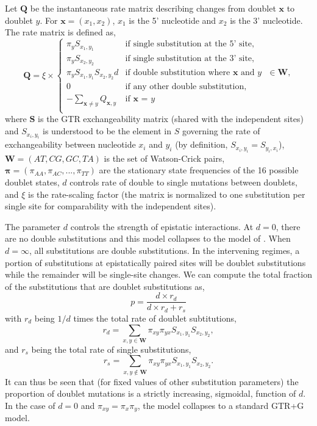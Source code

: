 \documentclass[11pt]{article}
\begin{document}
Let $\boldsymbol{Q}$ be the instantaneous rate matrix describing changes from doublet $\boldsymbol{x}$ to doublet $y$.
For $\boldsymbol{x} = (x_1, x_2)$, $x_1$ is the 5' nucleotide and $x_2$ is the 3' nucleotide.
The rate matrix is defined as,
\begin{equation}
\label{eq:Q}
\boldsymbol{Q} = \xi \times
\begin{cases}
   \pi_{y} S_{x_1, y_1} & \mbox{if single substitution at the 5' site,} \\
   \pi_{y} S_{x_2, y_2} & \mbox{if single substitution at the 3' site,} \\
   \pi_{y} S_{x_1, y_1} S_{x_2, y_2} d & \mbox{if double substitution where ${\boldsymbol{x}}$ and ${y}$ $\in {\boldsymbol{W}}$,} \\
   0 & \mbox{if any other double substitution,} \\
   - \sum_{\boldsymbol{x} \ne y} Q_{\boldsymbol{x},y}& \mbox{if $\boldsymbol{x}$ = $y$} \\
   \end{cases}
\end{equation}
where $\boldsymbol{S}$ is the GTR exchangeability matrix (shared with the independent sites) and $S_{x_i,y_i}$ is understood to be the element in $S$ governing the rate of exchangeability between nucleotide $x_i$ and $y_i$ (by definition, $S_{x_i,y_i} = S_{y_i,x_i}$),
${\boldsymbol{W}} = (AT, CG, GC, TA)$ is the set of Watson-Crick pairs,
$\boldsymbol{\pi} = (\pi_{AA}, \pi_{AC}, ..., \pi_{TT})$ are the stationary state frequencies of the 16 possible doublet states,
$d$ controls rate of double to single mutations between doublets,
and $\xi$ is the rate-scaling factor (the matrix is normalized to one substitution per single site for comparability with the independent sites).

The parameter $d$ controls the strength of epistatic interactions.
At $d = 0$, there are no double substitutions and this model collapses to the model of \cite{schoniger1994stochastic}.
When $d = \infty$, all substitutions are double substitutions.
In the intervening regimes, a portion of substitutions at epistatically paired sites will be doublet substitutions while the remainder will be single-site changes.
We can compute the total fraction of the substitutions that are doublet substitutions as,
\[
p = \frac{ d \times r_{d} }{d \times r_{d} + r_{s}}
\]
with $r_d$ being $1 / d$ times the total rate of doublet subtitutions,
\[
  r_{d} = \sum_{x,y \in \boldsymbol{W}} \pi_{xy} \pi_{yx} S_{x_1,y_1} S_{x_2,y_2},
\]
and $r_s$ being the total rate of single substitutions,
\[
  r_{s} = \sum_{x,y \not\in \boldsymbol{W}} \pi_{xy} \pi_{yx} S_{x_1,y_1} S_{x_2,y_2}.
\]
It can thus be seen that (for fixed values of other substitution parameters) the proportion of doublet mutations is a strictly increasing, sigmoidal, function of $d$.
In the case of $d = 0$ and $\pi_{xy} = \pi_x \pi_y$, the model collapses to a standard GTR+G model.
\end{document}
